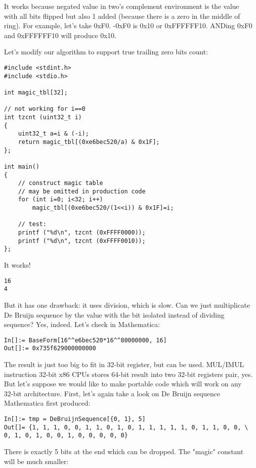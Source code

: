 It works because negated value in two's complement environment is the value with all bits flipped but also 1 added (because there is a zero in the middle of ring).
For example, let's take 0xF0. -0xF0 is 0x10 or 0xFFFFFF10. ANDing 0xF0 and 0xFFFFFF10 will produce 0x10.

Let's modify our algorithm to support true trailing zero bits count:

\begin{lstlisting}[style=customc]
#include <stdint.h>
#include <stdio.h>

int magic_tbl[32];

// not working for i==0
int tzcnt (uint32_t i)
{
	uint32_t a=i & (-i);
	return magic_tbl[(0xe6bec520/a) & 0x1F];
};

int main()
{
	// construct magic table
	// may be omitted in production code
	for (int i=0; i<32; i++)
		magic_tbl[(0xe6bec520/(1<<i)) & 0x1F]=i;

	// test:
	printf ("%d\n", tzcnt (0xFFFF0000));
	printf ("%d\n", tzcnt (0xFFFF0010));
};
\end{lstlisting}

It works!

\begin{lstlisting}
16
4
\end{lstlisting}

But it has one drawback: it uses division, which is slow.
Can we just multiplicate De Bruijn sequence by the value with the bit isolated instead of dividing sequence?
Yes, indeed.
Let's check in Mathematica:

\begin{lstlisting}
In[]:= BaseForm[16^^e6bec520*16^^80000000, 16]
Out[]:= 0x735f629000000000
\end{lstlisting}

The result is just too big to fit in 32-bit register, but can be used.
MUL/IMUL instruction 32-bit x86 CPUs stores 64-bit result into two 32-bit registers pair, yes.
But let's suppose we would like to make portable code which will work on any 32-bit architecture.
First, let's again take a look on De Bruijn sequence Mathematica first produced:

\begin{lstlisting}
In[]:= tmp = DeBruijnSequence[{0, 1}, 5]
Out[]= {1, 1, 1, 0, 0, 1, 1, 0, 1, 0, 1, 1, 1, 1, 1, 0, 1, 1, 0, 0, \
0, 1, 0, 1, 0, 0, 1, 0, 0, 0, 0, 0}
\end{lstlisting}

There is exactly 5 bits at the end which can be dropped.
The "magic" constant will be much smaller:

